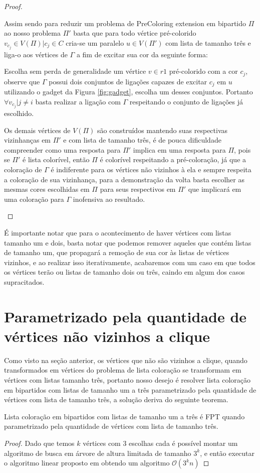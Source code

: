 \begin{proof}
\begin{itemize}
   Assim sendo para reduzir um problema de PreColoring extension em bipartido $\Pi$ ao nosso problema $\Pi'$ basta que para todo vértice pré-colorido $v_{c_j} \in V(\Pi) | c_j \in C$ cria-se um paralelo $u \in V(\Pi')$ com lista de tamanho três e liga-o aos vértices de $\Gamma$ a fim de excitar sua cor da seguinte forma: 
   
   Escolha sem perda de generalidade um vértice $v \in r1$ pré-colorido com a cor $c_j$, observe que $\Gamma$ possui dois conjuntos de ligações capazes de excitar $c_j$ em $u$ utilizando o gadget da Figura \ref{fig:gadget}, escolha um desses conjuntos. Portanto $\forall v_{c_j} | j \neq i$ basta realizar a ligação com $\Gamma$ respeitando o conjunto de ligações já escolhido.
   
    Os demais vértices de $V(\Pi)$ são construídos mantendo suas respectivas vizinhanças em $\Pi'$ e com lista de tamanho três, é de pouca dificuldade compreender como uma resposta para $\Pi'$ implica em uma resposta para $\Pi$, pois se $\Pi'$ é lista colorível, então $\Pi$ é colorível respeitando a pré-coloração, já que a coloração de $\Gamma$ é indiferente para os vértices não vizinhos à ela e sempre respeita a coloração de sua vizinhança, para a demonstração da volta basta escolher as mesmas cores escolhidas em $\Pi$ para seus respectivos em $\Pi'$ que implicará em uma coloração para $\Gamma$ inofensiva ao resultado. 
 \end{itemize}
\end{proof}


É importante notar que para o acontecimento de haver vértices com listas tamanho um e dois, basta notar que podemos remover aqueles que contém listas de tamanho um, que propagará a remoção de sua cor às listas de vértices vizinhos, e ao realizar isso iterativamente, acabaremos com um caso em que todos os vértices terão ou listas de tamanho dois ou três, caindo em algum dos casos supracitados.

\section{Parametrizado pela quantidade de vértices não vizinhos a clique}
Como visto na seção anterior, os vértices que não são vizinhos a clique, quando transformados em vértices do problema de lista coloração se transformam em vértices com listas tamanho três, portanto nosso desejo é resolver lista coloração em bipartidos com listas de tamanho um a três parametrizado pela quantidade de vértices com lista de tamanho três, a solução deriva do seguinte teorema.

\begin{teorema}
 Lista coloração em bipartidos com listas de tamanho um a três é FPT quando parametrizado pela quantidade de vértices com lista de tamanho três.
\end{teorema}
\begin{proof}
 Dado que temos $k$ vértices com 3 escolhas cada é possível montar um algoritmo de busca em árvore de altura limitada de tamanho $3^k$, e então executar o algoritmo linear proposto em \cite{hujter93} obtendo um algoritmo $\mathcal{O}(3^kn)$
 
\end{proof}
